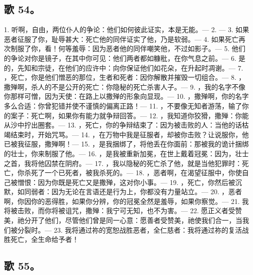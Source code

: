 
\subsection{歌 54。}

1. 听啊，自由，两位仆人的争论：他们如何彼此证实，本是无能。— 2. — 3. 如果恶者征服了你，耻辱甚大：死亡他的同伴证实了他，乃是软弱。— 4. 如果死亡再次制服了你，看！何等羞辱：因为恶者他的同伴嘲笑他，不过如影子。— 5. 他们的争论对你是镜子，在其中你可见：他们两者都如糠秕，在你气息之前。— 6. 是的，先知和宗徒，在他们的应许中：向你保证他们如花朵，在升起时凋谢。— 7. ，死亡，你是他们憎恶的那位，生者和死者：因你解散并摧毁一切组合。— 8. ，撒殚啊，杀人的不是公开的死亡：你隐秘的死亡杀害人子。— 9. ，我的名字不像你那样可憎，因为天使：在路上以撒殚的形象向显现。— 10. ，撒殚啊，你的名字多么合适：你曾犯错并使不谨慎的偏离正路！— 11. ，不要像无知者游荡，输了你的案子：死亡啊，如果你有能力就争辩回答。— 12. ，我知道你狡猾，撒殚：你能从沙中拧出圈套。— 13. ，死亡，你的争辩结束了：因为被击败的人：当他的话枯竭结束时，开始咒骂。— 14. ，在万物中我是征服者，却被你击败？让说服你，他已被我征服，撒殚啊！— 15. ，是我捆绑了，将他丢在你面前：那被我的诡计捆绑的壮士，你来制服了他。— 16. ，是我被重新加冕，在世上戴着冠冕：因为，壮士之首，我将他囚禁在阴府。— 17. ，我以隐秘的死亡杀了他，就是当他犯罪时：死亡，你杀死了一个已死者，被我杀死的。— 18. ，恶者啊，在渴望征服中，你使自己被憎恨：因为你既是死亡又是撒殚，这对你小事。— 19. ，死亡，你然后被沉默，如同弱者：因为无论在言语还是行为上，你都没有力量站立。— 20. ，恶者啊，你因你的恶得胜，如果你分辨，你的冠冕全然是羞辱，如果你察觉。— 21. 我将被击败，而你将被诅咒，撒殚：我宁可无知，也不为害。— 22. 愿正义者受赞美，祂分开了他们，尽管他们曾是同一心意：愿善者受赞美，祂使我们合一，当我们被分裂时。— 23. 我将通过祢的宽恕战胜恶者，全仁慈者：我将通过祢的复活战胜死亡，全生命给予者！\par


\subsection{歌 55。}


